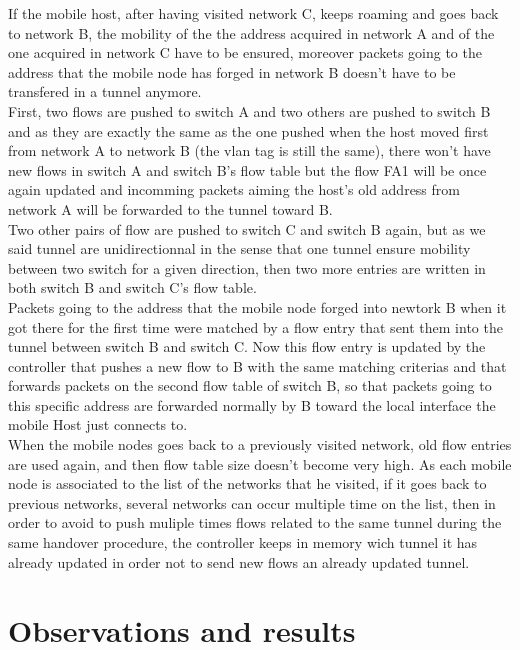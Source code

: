 \documentclass{article}
\begin{document}
If the mobile host, after having visited network C, keeps roaming and
goes back to network B, the mobility of the the address acquired in
network A and of the one acquired in network C have to be ensured,
moreover packets going to the address that the mobile node has forged
in network B doesn't have to be transfered in a tunnel anymore.\\
\newline
First, two flows are pushed to switch A and two others are pushed to
switch B and as they are exactly the same as the one pushed when the
host moved first from network A to network B (the vlan tag is still
the same), there won't have new flows in switch A and switch B's flow
table but the flow FA1 will be once again updated and incomming
packets aiming the host's old address from network A will be
forwarded to the tunnel toward B.\\
\newline
Two other pairs of flow are pushed to switch C and switch B again,
but as we said tunnel are unidirectionnal in the sense that one
tunnel ensure mobility between two switch for a given direction, then
two more entries are written in both switch B and switch C's flow
table.\\
\newline
Packets going to the address that the mobile node forged into newtork
B when it got there for the first time were matched by a flow entry
that sent them into the tunnel between switch B and switch C. Now
this flow entry is updated by the controller that pushes a new flow to
B with the same matching criterias and that forwards packets on the
second flow table of switch B, so that packets going to this specific
address are forwarded normally by B toward the local interface the
mobile Host just connects to. \\
\newline
When the mobile nodes goes back to a previously visited network, old
flow entries are used again, and then flow table size doesn't become
very high. As each mobile node is associated to the list of the
networks that he visited, if it goes back to previous networks,
several networks can occur multiple time on the list, then in order to
avoid to push muliple times flows related to the same tunnel during
the same handover procedure, the controller keeps in memory wich
tunnel it has already updated in order not to send new flows an
already updated tunnel.\\
\newline
\section{Observations and results} 
\end{document}
